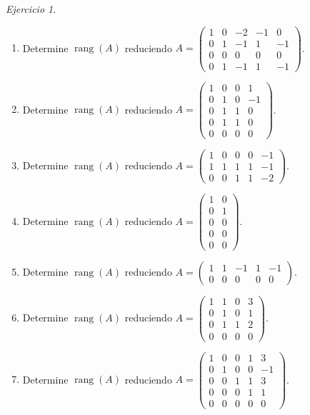 \documentclass[12pt]{article}
\theoremstyle{remark}
\newtheorem{Ejer}[definicion]{Ejercicio}
\newcommand{\rang}{\operatorname{rang}}
\begin{document}
\begin{Ejer}
\begin{enumerate}[resume=banco]
\item Determine $\rang(A)$ reduciendo $A=\begin{pmatrix}1&0&-2&-1&0\\0&1&-1&1&-1\\0&0&0&0&0\\0&1&-1&1&-1\end{pmatrix}$.

\item Determine $\rang(A)$ reduciendo $A=\begin{pmatrix}1&0&0&1\\0&1&0&-1\\0&1&1&0\\0&1&1&0\\0&0&0&0\end{pmatrix}$.

\item Determine $\rang(A)$ reduciendo $A=\begin{pmatrix}1&0&0&0&-1\\1&1&1&1&-1\\0&0&1&1&-2\end{pmatrix}$.

\item Determine $\rang(A)$ reduciendo $A=\begin{pmatrix}1&0\\0&1\\0&0\\0&0\\0&0\end{pmatrix}$.

\item Determine $\rang(A)$ reduciendo $A=\begin{pmatrix}1&1&-1&1&-1\\0&0&0&0&0\end{pmatrix}$.

\item Determine $\rang(A)$ reduciendo $A=\begin{pmatrix}1&1&0&3\\0&1&0&1\\0&1&1&2\\0&0&0&0\end{pmatrix}$.

\item Determine $\rang(A)$ reduciendo $A=\begin{pmatrix}1&0&0&1&3\\0&1&0&0&-1\\0&0&1&1&3\\0&0&0&1&1\\0&0&0&0&0\end{pmatrix}$.


\end{enumerate}
\end{Ejer}
\end{document}
